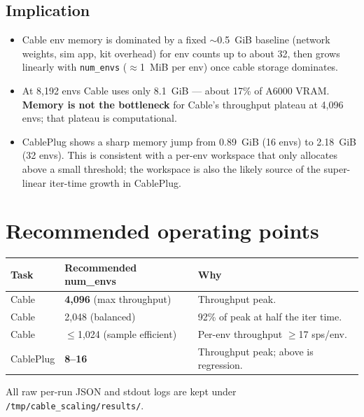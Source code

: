 \documentclass[11pt,a4paper]{article}
\begin{document}
\subsection{Implication}

\begin{itemize}\setlength\itemsep{2pt}
  \item Cable env memory is dominated by a fixed $\sim$0.5~GiB baseline
    (network weights, sim app, kit overhead) for env counts up to about 32,
    then grows linearly with \texttt{num\_envs} ($\approx$1~MiB per env)
    once cable storage dominates.
  \item At 8{,}192 envs Cable uses only 8.1~GiB --- about 17\% of A6000
    VRAM. \textbf{Memory is not the bottleneck} for Cable's throughput
    plateau at 4{,}096 envs; that plateau is computational.
  \item CablePlug shows a sharp memory jump from 0.89~GiB (16 envs) to
    2.18~GiB (32 envs). This is consistent with a per-env workspace that
    only allocates above a small threshold; the workspace is also the
    likely source of the super-linear iter-time growth in CablePlug.
\end{itemize}

\section{Recommended operating points}

\begin{tabular}{l l l}
\toprule
\textbf{Task} & \textbf{Recommended num\_envs} & \textbf{Why}\\
\midrule
Cable     & \textbf{4{,}096} (max throughput) & Throughput peak. \\
Cable     & 2{,}048 (balanced)                & 92\% of peak at half the iter time. \\
Cable     & $\leq$1{,}024 (sample efficient)  & Per-env throughput $\geq$17 sps/env. \\
CablePlug & \textbf{8--16}                    & Throughput peak; above is regression. \\
\bottomrule
\end{tabular}

\vspace{0.5em}
\noindent\textcolor{nvgrey}{\footnotesize All raw per-run JSON and stdout logs are kept under \texttt{/tmp/cable\_scaling/results/}.}
\end{document}
